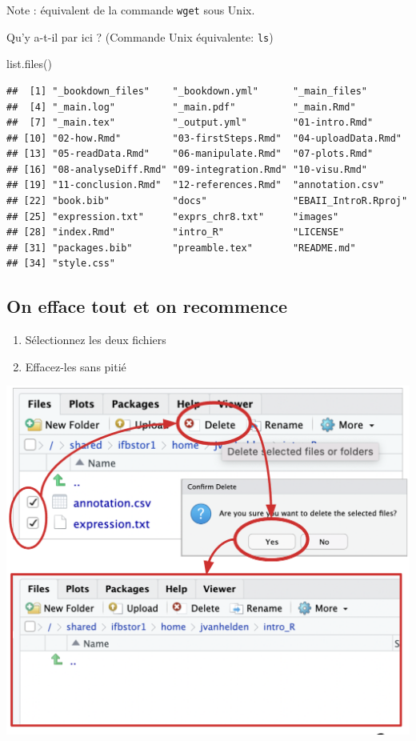 \documentclass[
]{book}
\newenvironment{Shaded}{\begin{snugshade}}{\end{snugshade}}
\newcommand{\FunctionTok}[1]{\textcolor[rgb]{0.00,0.00,0.00}{#1}}
\newcommand{\NormalTok}[1]{#1}
\providecommand{\tightlist}{%
  \setlength{\itemsep}{0pt}\setlength{\parskip}{0pt}}
\begin{document}
Note : équivalent de la commande \texttt{wget} sous Unix.

Qu'y a-t-il par ici ? (Commande Unix équivalente: \texttt{ls})

\begin{Shaded}
\begin{Highlighting}[]
\FunctionTok{list.files}\NormalTok{()}
\end{Highlighting}
\end{Shaded}

\begin{verbatim}
##  [1] "_bookdown_files"    "_bookdown.yml"      "_main_files"       
##  [4] "_main.log"          "_main.pdf"          "_main.Rmd"         
##  [7] "_main.tex"          "_output.yml"        "01-intro.Rmd"      
## [10] "02-how.Rmd"         "03-firstSteps.Rmd"  "04-uploadData.Rmd" 
## [13] "05-readData.Rmd"    "06-manipulate.Rmd"  "07-plots.Rmd"      
## [16] "08-analyseDiff.Rmd" "09-integration.Rmd" "10-visu.Rmd"       
## [19] "11-conclusion.Rmd"  "12-references.Rmd"  "annotation.csv"    
## [22] "book.bib"           "docs"               "EBAII_IntroR.Rproj"
## [25] "expression.txt"     "exprs_chr8.txt"     "images"            
## [28] "index.Rmd"          "intro_R"            "LICENSE"           
## [31] "packages.bib"       "preamble.tex"       "README.md"         
## [34] "style.css"
\end{verbatim}

\hypertarget{on-efface-tout-et-on-recommence-1}{%
\subsection{On efface tout et on recommence}\label{on-efface-tout-et-on-recommence-1}}

\begin{enumerate}
\def\labelenumi{\arabic{enumi}.}
\tightlist
\item
  Sélectionnez les deux fichiers
\item
  Effacez-les sans pitié
\end{enumerate}

\includegraphics{images/delete.png}
\end{document}
